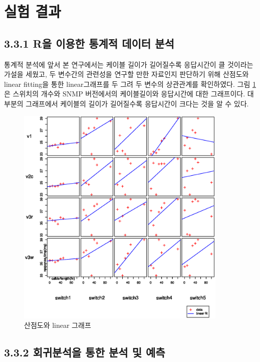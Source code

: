 \documentclass[11pt
  , a4paper
  , article
  , oneside
]{memoir}
\begin{document}
\clearpage
\section{실험 결과}
\subsection{3.3.1 R을 이용한 통계적 데이터 분석}

통계적 분석에 앞서 본 연구에서는 케이블 길이가 길어질수록 응답시간이 클 것이라는 가설을 세웠고, 두 변수간의 관련성을 연구할 만한 자료인지 판단하기 위해 산점도와 linear fitting을 통한 linear그래프를 두 그려 두 변수의 상관관계를 확인하였다. 그림 \ref{fig:linear}은 스위치의 개수와 SNMP 버전에서의 케이블길이와 응답시간에 대한 그래프이다. 대부분의 그래프에서 케이블의 길이가 길어질수록 응답시간이 크다는 것을 알 수 있다.

\begin{figure}[!htb]
  \centering
  \includegraphics[width=0.9\textwidth]{./images/sleep1_switch.eps}
  \caption{산점도와 linear 그래프}
  \label{fig:linear}   
\end{figure}


\clearpage

\subsection{3.3.2 회귀분석을 통한 분석 및 예측}
\end{document}
